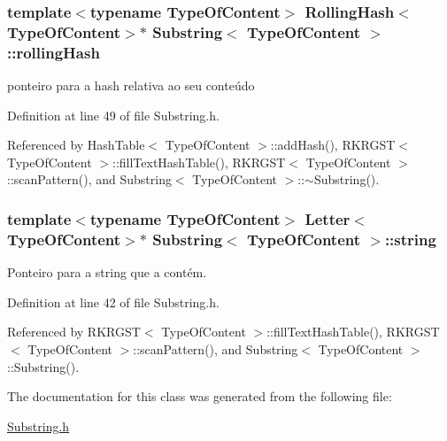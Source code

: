 \hypertarget{classSubstring_a84e0e55a0ecbd5f74d25441df0edc68e}{
\subsubsection[{rolling\+Hash}]{\setlength{\rightskip}{0pt plus 5cm}template$<$typename Type\+Of\+Content$>$ {\bf Rolling\+Hash}$<$Type\+Of\+Content$>$$\ast$ {\bf Substring}$<$ Type\+Of\+Content $>$\+::rolling\+Hash}}\label{classSubstring_a84e0e55a0ecbd5f74d25441df0edc68e}


ponteiro para a hash relativa ao seu conteúdo 



Definition at line 49 of file Substring.\+h.



Referenced by Hash\+Table$<$ Type\+Of\+Content $>$\+::add\+Hash(), R\+K\+R\+G\+S\+T$<$ Type\+Of\+Content $>$\+::fill\+Text\+Hash\+Table(), R\+K\+R\+G\+S\+T$<$ Type\+Of\+Content $>$\+::scan\+Pattern(), and Substring$<$ Type\+Of\+Content $>$\+::$\sim$\+Substring().

\hypertarget{classSubstring_a8d1fd97efa348288f4b39bea36a8e879}{
\subsubsection[{string}]{\setlength{\rightskip}{0pt plus 5cm}template$<$typename Type\+Of\+Content$>$ {\bf Letter}$<$Type\+Of\+Content$>$$\ast$ {\bf Substring}$<$ Type\+Of\+Content $>$\+::{\bf string}}}\label{classSubstring_a8d1fd97efa348288f4b39bea36a8e879}


Ponteiro para a string que a contém. 



Definition at line 42 of file Substring.\+h.



Referenced by R\+K\+R\+G\+S\+T$<$ Type\+Of\+Content $>$\+::fill\+Text\+Hash\+Table(), R\+K\+R\+G\+S\+T$<$ Type\+Of\+Content $>$\+::scan\+Pattern(), and Substring$<$ Type\+Of\+Content $>$\+::\+Substring().



The documentation for this class was generated from the following file\+:\begin{DoxyCompactItemize}
\item 
\hyperlink{Substring_8h}{Substring.\+h}\end{DoxyCompactItemize}

